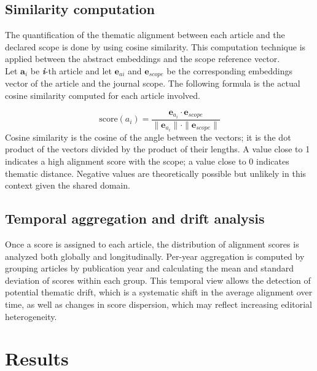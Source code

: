 \documentclass[pdflatex,sn-mathphys-num]{sn-jnl}%
\theoremstyle{thmstyleone}%
\theoremstyle{thmstyletwo}%
\theoremstyle{thmstylethree}%
\begin{document}
\subsection{Similarity computation}\label{subsec4}

The quantification of the thematic alignment between each article and the declared scope is done by using cosine similarity.
This computation technique is applied between the abstract embeddings and the scope reference vector.\\
Let $\mathbf{a}_i$ be \textit{\textbf{i}}-th article and let $\mathbf{e}_{ai}$ and $\mathbf{e}_{scope}$ be the corresponding embeddings vector of the article and the journal scope. The following formula is the actual cosine similarity computed for each article involved.

{\large
\[
\text{score}(a_i) = \frac{\mathbf{e}_{a_i} \cdot \mathbf{e}_{scope}}{\|\mathbf{e}_{a_i}\| \cdot \|\mathbf{e}_{scope}\|}
\]
}
Cosine similarity is the cosine of the angle between the vectors; it is the dot product of the vectors divided by the product of their lengths. A value close to 1 indicates a high alignment score with the scope; a value close to 0 indicates thematic distance. Negative values are theoretically possible but unlikely in this context given the shared domain.

\subsection{Temporal aggregation and drift analysis}\label{subsec5}

Once a score is assigned to each article, the distribution of alignment scores is analyzed both globally and longitudinally. Per-year aggregation is computed by grouping articles by publication year and calculating the mean and standard deviation of scores within each group. This temporal view allows the detection of potential thematic drift, which is a systematic shift in the average alignment over time, as well as changes in score dispersion, which may reflect increasing editorial heterogeneity.

\section{Results}\label{sec4}
\end{document}
